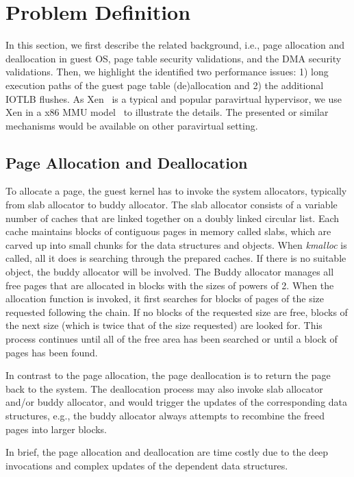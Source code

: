 \section{Problem Definition} \label{sec:prob}
In this section, we first describe the related background, i.e., page allocation and deallocation in guest OS, page table security validations, and the DMA security validations.
Then, we highlight the identified two performance issues: 1) long execution paths of the guest page table (de)allocation and 2) the additional IOTLB flushes.
As Xen~\cite{XEN-SOSP03} is a typical and popular paravirtual hypervisor, we use Xen in a x86 MMU model~\cite{x86-pv-model} to illustrate the details. 
The presented or similar mechanisms would be available on other paravirtual setting.
 
\subsection{Page Allocation and Deallocation}
To allocate a page, the guest kernel has to invoke the system allocators, typically from slab allocator to buddy allocator.
The slab allocator consists of a variable number of caches that are linked together on a doubly linked circular list. 
Each cache maintains blocks of contiguous pages in memory called slabs, which are carved up into small chunks for the data structures and objects. 
When \emph{kmalloc} is called, all it does is searching through the prepared caches. 
If there is no suitable object, the buddy allocator will be involved.
The Buddy allocator manages all free pages that are allocated in blocks with the sizes of powers of 2.  
When the allocation function is invoked, it first searches for blocks of pages of the size requested following the chain.
If no blocks of the requested size are free, blocks of the next size (which is twice that of the size requested) are looked for. 
This process continues until all of the free area has been searched or until a block of pages has been found. 

In contrast to the page allocation, the page deallocation is to return the page back to the system.
The deallocation process may also invoke slab allocator and/or buddy allocator, and would trigger the updates of the corresponding data structures, 
e.g., the buddy allocator always attempts to recombine the freed pages into larger blocks.

In brief, the page allocation and deallocation are time costly due to the deep invocations and complex updates of the dependent data structures.


